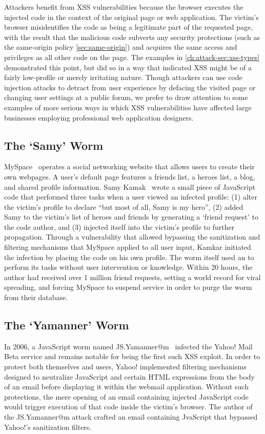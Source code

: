 Attackers benefit from XSS vulnerabilities because the browser executes the injected code in the context of the original page or web application.
The victim's browser misidentifies the code as being a legitimate part of the requested page, with the result that the malicious code subverts any security protections (such as the same-origin policy \autoref{sec:same-origin}) and acquires the same access and privileges as all other code on the page.
The examples in \autoref{ch:attack-sec:xss-types} demonstrated this point, but did so in a way that indicated XSS might be of a fairly low-profile or merely irritating nature.
Though attackers can use code injection attacks to detract from user experience by defacing the visited page or changing user settings at a public forum, we prefer to draw attention to some examples of more serious ways in which XSS vulnerabilities have affected large businesses employing professional web application designers.

\subsection{The `Samy' Worm}
MySpace~\cite{myspace} operates a social networking website that allows users to create their own webpages.
A user's default page features a friends list, a heroes list, a blog, and shared profile information.
Samy Kamak~\cite{samy} wrote a small piece of JavaScript code that performed three tasks when a user viewed an infected profile: (1) alter the victim's profile to declare ``but most of all, Samy is my hero'', (2) added Samy to the victim's list of heroes and friends by generating a `friend request' to the code author, and (3) injected itself into the victim's profile to further propagation.
Through a vulnerability that allowed bypassing the sanitization and filtering mechanisms that MySpace applied to all user input, Kamkar initiated the infection by placing the code on his own profile.
The worm itself used an  to perform its tasks without user intervention or knowledge.
Within 20 hours, the author had received over 1 million friend requests, setting a world record for viral spreading, and forcing MySpace to suspend service in order to purge the worm from their database.

\subsection{The `Yamanner' Worm}
In 2006, a JavaScript worm named JS.Yamanner@m~\cite{yamanner} infected the Yahoo! Mail Beta service and remains notable for being the first such XSS exploit.
In order to protect both themselves and users, Yahoo! implemented filtering mechanisms designed to neutralize JavaScript and certain HTML expressions from the body of an email before displaying it within the webmail application.
Without such protections, the mere opening of an email containing injected JavaScript code would trigger execution of that code inside the victim's browser.
The author of the JS.Yamanner@m attack crafted an email containing JvaScript that bypassed Yahoo!'s sanitization filters.



